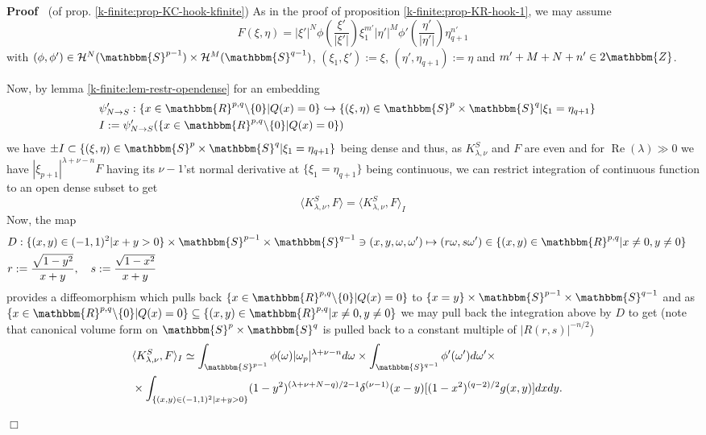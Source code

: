 \documentclass{article}
\newcommand{\assign}{:=}
\newcommand{\tmop}[1]{\ensuremath{\operatorname{#1}}}
\newenvironment{proof}{\noindent\textbf{Proof\ }}{\hspace*{\fill}$\Box$\medskip}
\begin{document}
\begin{proof}
  (of prop. \ref{k-finite:prop-KC-hook-kfinite}) As in the proof of
  proposition \ref{k-finite:prop-KR-hook-1}, we may assume
  \[ F (\xi, \eta) = | \xi' |^N \phi \left( \frac{\xi'}{| \xi' |} \right)
     \xi_1^{m'} | \eta' |^M \phi' \left( \frac{\eta'}{| \eta' |} \right)
     \eta_{q + 1}^{n'} \]
  with $(\phi, \phi') \in \mathcal{H}^N (\mathbbm{S}^{p - 1}) \times
  \mathcal{H}^M (\mathbbm{S}^{q - 1})$, $(\xi_1, \xi') \assign \xi$, $(\eta',
  \eta_{q + 1}) \assign \eta$ and $m' + M + N + n' \in 2\mathbbm{Z}$.
  
  Now, by lemma \ref{k-finite:lem-restr-opendense} for an embedding
  \begin{eqnarray}
    & \psi_{N \rightarrow S}' : \{ x \in \mathbbm{R}^{p, q} \backslash \{ 0
    \} | Q (x) = 0 \} \hookrightarrow \{ (\xi, \eta) \in \mathbbm{S}^p \times
    \mathbbm{S}^q | \xi_1 = \eta_{q + 1} \} &  \nonumber\\
    & I \assign \psi'_{N \rightarrow S} (\{ x \in \mathbbm{R}^{p, q}
    \backslash \{ 0 \} | Q (x) = 0 \}) &  \nonumber
  \end{eqnarray}
  we have $\pm I \subset \{ (\xi, \eta) \in \mathbbm{S}^p \times \mathbbm{S}^q
  | \xi_1 = \eta_{q + 1} \}$ being dense and thus, as $K_{\lambda, \nu}^S$ and
  $F$ are even and for $\tmop{Re} (\lambda) \gg 0$ we have $| \xi_{p + 1}
  |^{\lambda + \nu - n} F$ having its $\nu - 1$'st normal derivative at $\{
  \xi_1 = \eta_{q + 1} \}$ being continuous, we can restrict integration of
  continuous function to an open dense subset to get
  \[ \langle K_{\lambda, \nu}^S, F \rangle = \langle K_{\lambda, \nu}^S, F
     \rangle_I \]
  Now, the map
  \begin{eqnarray}
    & D : \{ (x, y) \in (- 1, 1)^2 | x + y > 0 \} \times \mathbbm{S}^{p - 1}
    \times \mathbbm{S}^{q - 1} \ni (x, y, \omega, \omega') \mapsto (r \omega,
    s \omega') \in \{ (x, y) \in \mathbbm{R}^{p, q} | x \neq 0, y \neq 0 \} & 
    \nonumber\\
    & r : = \frac{\sqrt{1 - y^2}}{x + y}, \quad s : = \frac{\sqrt{1 - x^2}}{x
    + y} &  \nonumber
  \end{eqnarray}
  provides a diffeomorphism which pulls back $\{ x \in \mathbbm{R}^{p, q}
  \backslash \{ 0 \} | Q (x) = 0 \}$ to $\{ x = y \} \times \mathbbm{S}^{p -
  1} \times \mathbbm{S}^{q - 1}$ and as $\{ x \in \mathbbm{R}^{p, q}
  \backslash \{ 0 \} | Q (x) = 0 \} \subseteq \{ (x, y) \in \mathbbm{R}^{p, q}
  | x \neq 0, y \neq 0 \}$ we may pull back the integration above by $D$ to
  get (note that canonical volume form on $\mathbbm{S}^p \times \mathbbm{S}^q$
  is pulled back to a constant multiple of $| R (r, s) |^{- n / 2}$)
  \begin{eqnarray}
    & \langle K_{\lambda, \nu}^S, F \rangle_I \simeq \int_{\mathbbm{S}^{p -
    1}} \phi (\omega) | \omega_p |^{\lambda + \nu - n} d \omega_{} \times
    \int_{\mathbbm{S}^{q - 1}} \phi' (\omega') d \omega' \times &  \nonumber\\
    & \times \int_{\{ (x, y) \in (- 1, 1)^2 | x + y > 0 \}} (1 -
    y^2)^{(\lambda + \nu + N - q) / 2 - 1} \delta^{(\nu - 1)} (x - y) [(1 -
    x^2)^{(q - 2) / 2} g (x, y)] d x d y. &  \nonumber
  \end{eqnarray}
  

\end{proof}
\end{document}
